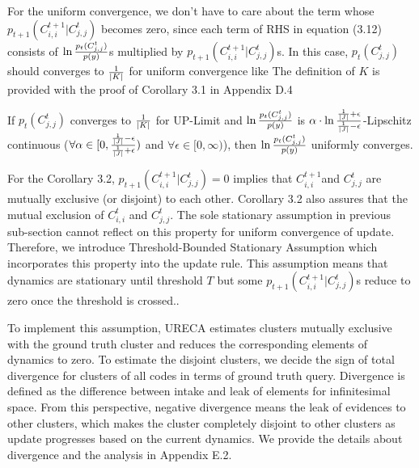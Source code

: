 For the uniform convergence, we don’t have to care about the term whose $p_{t+1}(C^{t+1}_{i,i}|C^t_{j,j})$ 
becomes zero, since each term of RHS in equation (3.12) consists of $\ln {p_t(C^t_{j,j})\over p(y)}$s 
multiplied by $p_{t+1}(C^{t+1}_{i,i}|C^t_{j,j})$s. 
In this case, $p_t(C^t_{j,j})$ should converges to ${1 \over |K|}$ for uniform convergence like 
The definition of $K$ is provided with the proof of Corollary 3.1 in Appendix D.4
\begin{corollary}
\label{cor:restricted_uniform_convergence}
If $p_t(C^t_{j,j})$ converges to ${1 \over |K|}$ for UP-Limit and $\ln {p_t(C^t_{j,j}) \over p(y)}$  
is $\alpha\cdot\ln{{1 \over |J|} +\epsilon \over {1 \over |J|}-\epsilon}$-Lipschitz continuous 
($\forall \alpha \in [0,{{1 \over |J|} -\epsilon \over {1 \over |J|} +\epsilon})$ 
and $\forall \epsilon \in [0,\infty)$), then $\ln {p_t(C^t_{j,j}) \over p(y)}$ uniformly converges.
\end{corollary}
For the Corollary 3.2, $p_{t+1}(C^{t+1}_{i,i}|C^t_{j,j})=0$ implies that  $C^{t+1}_{i,i}$and $C^t_{j,j}$ 
are mutually exclusive (or disjoint) to each other.
Corollary 3.2 also assures that the mutual exclusion of $C^t_{i,i}$ and $C^{t}_{j,j}$.
The sole stationary assumption in previous sub-section cannot reflect on this property for uniform convergence of update.
Therefore, we introduce Threshold-Bounded Stationary Assumption which incorporates this property 
into the update rule.
This assumption means that dynamics are stationary until threshold $T$ 
but some $p_{t+1}(C^{t+1}_{i,i}|C^t_{j,j})$s reduce to zero once the threshold is crossed..

To implement this assumption, URECA estimates clusters mutually exclusive with the ground truth cluster 
and reduces the corresponding elements of dynamics to zero.
To estimate the disjoint clusters, 
we decide the sign of total divergence for clusters of all codes in terms of ground truth query.
Divergence is defined as the difference between intake and leak of elements for infinitesimal space. 
From this perspective, negative divergence means the leak of evidences to other clusters, 
which makes the cluster completely disjoint to other clusters as update progresses based on the current dynamics.
We provide the details about divergence and the analysis in Appendix E.2. 

